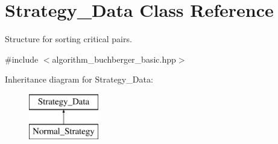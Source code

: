 \hypertarget{class_strategy___data}{}\section{Strategy\+\_\+\+Data Class Reference}
\label{class_strategy___data}


Structure for sorting critical pairs.  




{\ttfamily \#include $<$algorithm\+\_\+buchberger\+\_\+basic.\+hpp$>$}

Inheritance diagram for Strategy\+\_\+\+Data\+:\begin{figure}[H]
\begin{center}
\leavevmode
\includegraphics[height=2.000000cm]{class_strategy___data}
\end{center}
\end{figure}
